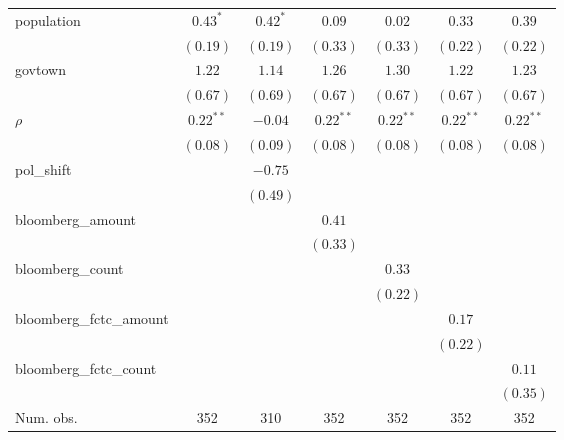 \begin{table}[!h]
\begin{center}
\begin{tabular}{l c c c c c c }
population              & $0.43^{*}$   & $0.42^{*}$   & $0.09$       & $0.02$       & $0.33$       & $0.39$       \\
                        & $(0.19)$     & $(0.19)$     & $(0.33)$     & $(0.33)$     & $(0.22)$     & $(0.22)$     \\
govtown                 & $1.22$       & $1.14$       & $1.26$       & $1.30$       & $1.22$       & $1.23$       \\
                        & $(0.67)$     & $(0.69)$     & $(0.67)$     & $(0.67)$     & $(0.67)$     & $(0.67)$     \\
$\rho$                  & $0.22^{**}$  & $-0.04$      & $0.22^{**}$  & $0.22^{**}$  & $0.22^{**}$  & $0.22^{**}$  \\
                        & $(0.08)$     & $(0.09)$     & $(0.08)$     & $(0.08)$     & $(0.08)$     & $(0.08)$     \\
pol\_shift              &              & $-0.75$      &              &              &              &              \\
                        &              & $(0.49)$     &              &              &              &              \\
bloomberg\_amount       &              &              & $0.41$       &              &              &              \\
                        &              &              & $(0.33)$     &              &              &              \\
bloomberg\_count        &              &              &              & $0.33$       &              &              \\
                        &              &              &              & $(0.22)$     &              &              \\
bloomberg\_fctc\_amount &              &              &              &              & $0.17$       &              \\
                        &              &              &              &              & $(0.22)$     &              \\
bloomberg\_fctc\_count  &              &              &              &              &              & $0.11$       \\
                        &              &              &              &              &              & $(0.35)$     \\
\midrule
Num. obs.               & 352          & 310          & 352          & 352          & 352          & 352          \\

\end{tabular}
\end{center}
\end{table}
